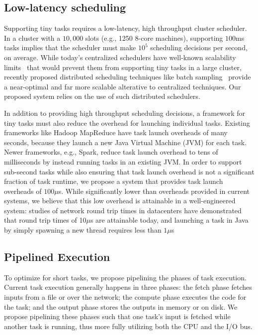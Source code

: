 \subsection{Low-latency scheduling}
Supporting tiny tasks requires a low-latency, high throughput cluster scheduler.
In a cluster with a $10,000$ slots (e.g., 1250 8-core machines),
supporting $100$ms tasks implies that the scheduler must make $10^5$ scheduling
decisions per second, on average.
While today's centralized schedulers have well-known scalability
limits~\cite{wilkesberkeley} that
would prevent them from supporting tiny tasks in a large cluster,
recently proposed distributed scheduling techniques like batch
sampling~\cite{ousterhoutbatch} provide a near-optimal and far more scalable
alterative to centralized techniques.
Our proposed system relies on the use of such distributed schedulers.

In addition to providing high throughput scheduling decisions, a framework for
tiny tasks must also reduce the overhead
for launching individual tasks. Existing frameworks like Hadoop MapReduce
have task launch overheads of many seconds, because they launch a new Java
Virtual Machine (JVM) for each task. Newer frameworks, e.g., Spark, reduce task
launch overhead to tens of milliseconds by instead running tasks in an
existing JVM.  In order to support sub-second tasks while also ensuring that
task launch overhead is not a significant fraction of task runtime, we propose a system
that provides task launch overheads of $100 \mu$s. While significantly
lower than overheads provided in current systems, we believe that this low
overhead is attainable in a well-engineered system:
studies of network round
trip times in datacenters have demonstrated that round trip times of 10$\mu$s
are attainable today, and launching a task in Java by simply
spawning a new thread requires less than $1\mu$s

\subsection{Pipelined Execution}
\label{sec:pipeline}
To optimize for short tasks, we propose pipelining the phases of task execution.
Current task execution generally happens in three phases: the fetch phase fetches inputs from a file or over the network; the compute phase executes the code
for the task; and the output phase stores the outputs in memory or on disk.
We propose pipelining these phases such that one task's input is fetched while
another task is running, thus more fully utilizing both the CPU and the I/O
bus.

